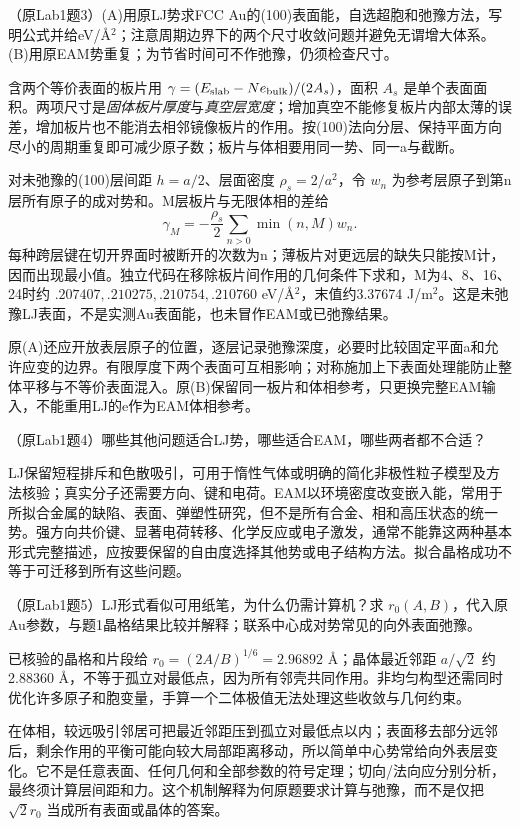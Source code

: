 \begin{exercise}\label{task:lab1-3}
（原Lab1题3）(A)用原LJ势求FCC Au的(100)表面能，自选超胞和弛豫方法，写明公式并给eV/\AA$^2$；注意周期边界下的两个尺寸收敛问题并避免无谓增大体系。(B)用原EAM势重复；为节省时间可不作弛豫，仍须检查尺寸。
\end{exercise}
\begin{solution}
含两个等价表面的板片用 $\gamma=(E_{\rm slab}-Ne_{\rm bulk})/(2A_s)$，面积 $A_s$ 是单个表面面积。两项尺寸是\emph{固体板片厚度}与\emph{真空层宽度}；增加真空不能修复板片内部太薄的误差，增加板片也不能消去相邻镜像板片的作用。按(100)法向分层、保持平面方向尽小的周期重复即可减少原子数；板片与体相要用同一势、同一a与截断。

对未弛豫的(100)层间距 $h=a/2$、层面密度 $\rho_s=2/a^2$，令 $w_n$ 为参考层原子到第n层所有原子的成对势和。M层板片与无限体相的差给
\[
 \gamma_M=-\frac{\rho_s}{2}\sum_{n>0}\min(n,M)w_n.
\]
每种跨层键在切开界面时被断开的次数为n；薄板片对更远层的缺失只能按M计，因而出现最小值。独立代码在移除板片间作用的几何条件下求和，M为4、8、16、24时约 $.207407,.210275,.210754,.210760$ eV/\AA$^2$，末值约3.37674 J/m$^2$。这是未弛豫LJ表面，不是实测Au表面能，也未冒作EAM或已弛豫结果。

原(A)还应开放表层原子的位置，逐层记录弛豫深度，必要时比较固定平面a和允许应变的边界。有限厚度下两个表面可互相影响；对称施加上下表面处理能防止整体平移与不等价表面混入。原(B)保留同一板片和体相参考，只更换完整EAM输入，不能重用LJ的e作为EAM体相参考。
\end{solution}

\begin{exercise}\label{task:lab1-4}
（原Lab1题4）哪些其他问题适合LJ势，哪些适合EAM，哪些两者都不合适？
\end{exercise}
\begin{solution}
LJ保留短程排斥和色散吸引，可用于惰性气体或明确的简化非极性粒子模型及方法核验；真实分子还需要方向、键和电荷。EAM以环境密度改变嵌入能，常用于所拟合金属的缺陷、表面、弹塑性研究，但不是所有合金、相和高压状态的统一势。强方向共价键、显著电荷转移、化学反应或电子激发，通常不能靠这两种基本形式完整描述，应按要保留的自由度选择其他势或电子结构方法。拟合晶格成功不等于可迁移到所有这些问题。
\end{solution}
\begin{exercise}\label{task:lab1-5}
（原Lab1题5）LJ形式看似可用纸笔，为什么仍需计算机？求 $r_0(A,B)$，代入原Au参数，与题1晶格结果比较并解释；联系中心成对势常见的向外表面弛豫。
\end{exercise}
\begin{solution}
已核验的晶格和片段给 $r_0=(2A/B)^{1/6}=2.96892$ \AA{}；晶体最近邻距 $a/\sqrt2$ 约2.88360 \AA{}，不等于孤立对最低点，因为所有邻壳共同作用。非均匀构型还需同时优化许多原子和胞变量，手算一个二体极值无法处理这些收敛与几何约束。

在体相，较远吸引邻居可把最近邻距压到孤立对最低点以内；表面移去部分远邻后，剩余作用的平衡可能向较大局部距离移动，所以简单中心势常给向外表层变化。它不是任意表面、任何几何和全部参数的符号定理；切向/法向应分别分析，最终须计算层间距和力。这个机制解释为何原题要求计算与弛豫，而不是仅把 $\sqrt2r_0$ 当成所有表面或晶体的答案。
\end{solution}

